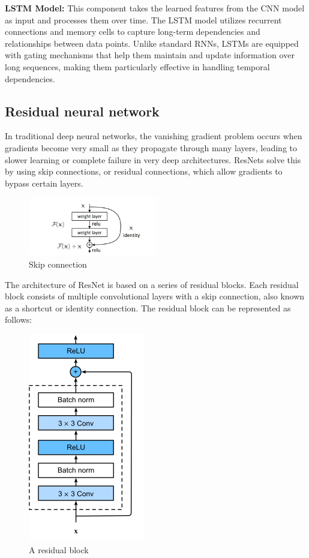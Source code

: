 \documentclass[conference]{IEEEtran}
\begin{document}
\textbf{LSTM Model:} This component takes the learned features from the CNN model as input and processes them over time. The LSTM model utilizes recurrent connections and memory cells to capture long-term dependencies and relationships between data points. Unlike standard RNNs, LSTMs are equipped with gating mechanisms that help them maintain and update information over long sequences, making them particularly effective in handling temporal dependencies.

\subsection{Residual neural network}
In traditional deep neural networks, the vanishing gradient problem occurs when gradients become very small as they propagate through many layers, leading to slower learning or complete failure in very deep architectures. ResNets solve this by using skip connections, or residual connections, which allow gradients to bypass certain layers.

\begin{figure}[htbp]
    \centering
    \includegraphics[width=0.5\textwidth]{Figure/resnet.png}
    \caption{Skip connection}
    \label{fig:enter-label}
\end{figure}

The architecture of ResNet is based on a series of residual blocks. Each residual block consists of multiple convolutional layers with a skip connection, also known as a shortcut or identity connection. The residual block can be represented as follows:
\begin{figure}[htbp]
    \centering
    \includegraphics[height=0.3\textheight]{Figure/resnet-block.png}
    \caption{A residual block}
    \label{fig:enter-label}
\end{figure}
\end{document}
